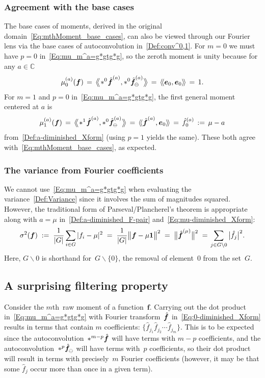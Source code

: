 \documentclass[letterpaper,11pt]{article}
\newcommand{\bs}[1]{{\boldsymbol{#1}}}
\newcommand{\gr}[1]{( #1 )}
\newcommand{\abs}[1]{\vert #1 \vert}
\newcommand{\Abs}[1]{\big\vert #1 \big\vert}
\newcommand{\set}[1]{\{ #1 \}}
\newcommand{\Set}[1]{\big\{ #1 \big\}}
\newcommand{\C}{\mathbb C}
\newcommand{\conv}{\ast}
\newcommand{\dimin}[2]{{ #1 }^{\gr{#2}}}
\newcommand{\Norm}[1]{\big\Vert #1 \big\Vert}
\newcommand{\dotprod}[2]{\langle\!\langle #1, #2 \rangle\!\rangle}
\newcommand{\Dotprod}[2]{\big\langle\!\:\!\!\big\langle #1, #2 \big\rangle\!\:\!\!\big\rangle}
\newcommand{\hatbsf}{{\kern+0.25em}\hat{{\kern-0.25em}\bs{f}}}
\newcommand{\mth}{$m$th}
\theoremstyle{definition} \newtheorem{remark}{Remark}
\begin{document}
\subsubsection{Agreement with the base cases}
The base cases of moments, derived in the original domain~\eqref{Eq:mthMoment_base_cases}, can also be viewed through our Fourier lens via the base cases of autoconvolution in~\eqref{Def:conv^0,1}. For $m=0$ we must have $p=0$ in~\eqref{Eq:mu_m^a=g*gtg*g}, so the zeroth moment is unity because for any $a\in\C$
$$
\dimin{\mu}{a}_0\gr{\bs{f}} \,=\, \Dotprod{\!\conv^0 \!\dimin{\hatbsf}{a}}{\conv^0 \dimin{\hatbsf}{a}_{\!\ominus}}
\,=\, \dotprod{\bs{e}_0}{\bs{e}_0} \,=\, 1.
$$
For $m=1$ and $p=0$ in~\eqref{Eq:mu_m^a=g*gtg*g}, the first general moment centered at $a$ is
\begin{equation} \label{Eq:AgreeBaseCase_m=1}
\dimin{\mu}{a}_1\gr{\bs{f}} \,=\, \Dotprod{\!\conv^1 \!\dimin{\hatbsf}{a}}{\conv^0 \dimin{\hatbsf}{a}_{\!\ominus}}
\,=\, \dotprod{\dimin{\hatbsf}{a}}{\bs{e}_0} \,=\, \dimin{\hat{f}}{a}_0 \,:=\, \mu - a
\end{equation}
from~\eqref{Def:a-diminished_Xform} (using $p=1$ yields the same). These both agree with~\eqref{Eq:mthMoment_base_cases}, as expected.


\subsubsection{The variance from Fourier coefficients}
We cannot use~\eqref{Eq:mu_m^a=g*gtg*g} when evaluating the variance~\eqref{Def:Variance} since it involves the sum of magnitudes squared. However, the traditional form of Parseval/Plancherel's theorem is appropriate along with $a=\mu$ in~\eqref{Def:a-diminished_F-pair} and~\eqref{Eq:mu-diminished_Xform}:
\begin{equation}  \label{Eq:variance_|fj|^2}
\sigma^2\gr{\bs{f}} \;:=\; \frac{1}{\abs{G}} \sum_{i\in G} \abs{f_i-\mu}^2
\;=\; \frac{1}{\abs{G}} \Norm{\bs{f} - \mu\bs{1}}^2
\;=\; \Norm{\dimin{\hatbsf}{\mu}}^2
\;=\;
\!\sum_{j\in G\backslash0} \Abs{\hat{f}_j}^2.
\end{equation}
Here, $G\backslash0$ is shorthand for~$G\backslash\set{0}$, the removal of element~$0$ from the set~$G$.


\subsection{A surprising filtering property}
Consider the \mth\ raw moment of a function~$\bs{f}$. Carrying out the dot product in~\eqref{Eq:mu_m^a=g*gtg*g} with Fourier transform~$\hatbsf$ in~\eqref{Eq:0-diminished_Xform}
results in terms that contain $m$ coefficients: $\Set{\hat{f}_{j_1} \hat{f}_{j_2} \cdots \hat{f}_{j_m}}$. This is to be expected since the autoconvolution~$\conv^{m-p} \hatbsf$ will have terms with ${m-p}$ coefficients, and the autoconvolution~$\conv^p {\hatbsf}_{\!\ominus}$ will have terms with~$p$ coefficients, so their dot product will result in terms with precisely~$m$ Fourier coefficients (however, it may be that some $\hat{f}_j$ occur more than once in a given term).
\end{document}

